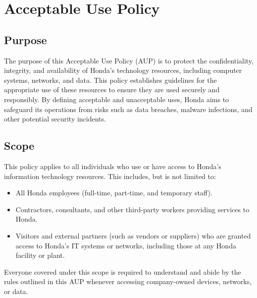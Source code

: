 \chapter{Acceptable Use Policy}\label{chap:acceptable-use}
\pagestyle{fancy}

\fancyhf{}

\fancyfoot[C]{\thepage}

\renewcommand{\headrulewidth}{0pt}
\renewcommand{\footrulewidth}{0pt}



\section{Purpose}
The purpose of this Acceptable Use Policy (AUP) is to protect the confidentiality, integrity, and availability of Honda's technology resources, including computer systems, networks, and data. This policy establishes guidelines for the appropriate use of these resources to ensure they are used securely and responsibly. By defining acceptable and unacceptable uses, Honda aims to safeguard its operations from risks such as data breaches, malware infections, and other potential security incidents.

\section{Scope}
This policy applies to all individuals who use or have access to Honda's information technology resources. This includes, but is not limited to:
\begin{itemize}
    \item All Honda employees (full-time, part-time, and temporary staff).
    \item Contractors, consultants, and other third-party workers providing services to Honda.
    \item Visitors and external partners (such as vendors or suppliers) who are granted access to Honda's IT systems or networks, including those at any Honda facility or plant.
\end{itemize}
Everyone covered under this scope is required to understand and abide by the rules outlined in this AUP whenever accessing company-owned devices, networks, or data.


